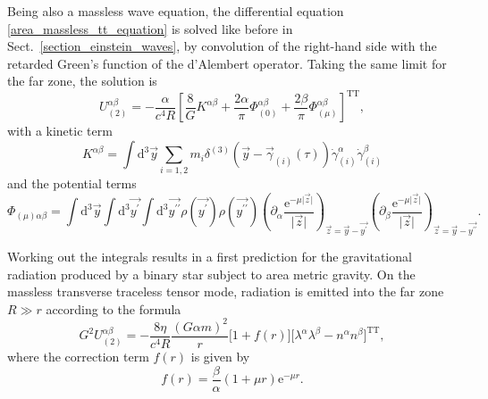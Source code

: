 Being also a massless wave equation, the differential equation \eqref{area_massless_tt_equation} is solved like before in Sect.~\ref{section_einstein_waves}, by convolution of the right-hand side with the retarded Green's function of the d'Alembert operator. Taking the same limit for the far zone, the solution is
\begin{equation}
  U^{\alpha\beta}_{(2)} = -\frac{\alpha}{c^4R}\left\lbrack \frac{8}{G} K^{\alpha\beta} + \frac{2\alpha}{\pi}\Phi^{\alpha\beta}_{(0)} + \frac{2\beta}{\pi}\Phi^{\alpha\beta}_{(\mu)} \right\rbrack^\text{TT},
\end{equation}
with a kinetic term
\begin{equation}
  K^{\alpha\beta} = \int\mathrm d^3\vec y\sum_{i=1,2}m_i\delta^{(3)}(\vec y-\vec\gamma_{(i)}(\tau))\dot\gamma^\alpha_{(i)}\dot\gamma^\beta_{(i)}
\end{equation}
and the potential terms
\begin{equation}
  \Phi_{(\mu)\alpha\beta} = \int\mathrm d^3\vec y \int\mathrm d^3\vec{y^\prime} \int\mathrm d^3\vec{y^{\prime\prime}} \rho(\vec{y^\prime}) \rho(\vec{y^{\prime\prime}}) \left(\partial_\alpha\frac{\mathrm e^{-\mu\lvert\vec z\rvert}}{\lvert\vec z\rvert}\right)_{\!\!\vec z=\vec y-\vec{y^\prime}} \left(\partial_\beta\frac{\mathrm e^{-\mu\lvert\vec z\rvert}}{\lvert\vec z\rvert}\right)_{\!\!\vec z=\vec y-\vec{y^{\prime\prime}}}.
\end{equation}

Working out the integrals results in a first prediction for the gravitational radiation produced by a binary star subject to area metric gravity. On the massless transverse traceless tensor mode, radiation is emitted into the far zone $R\gg r$ according to the formula
\begin{equation}\label{area_metric_radiation_massless}
  G^2 U^{\alpha\beta}_{(2)} = -\frac{8\eta}{c^4 R} \frac{(G\alpha m)^2}{r}\lbrack 1+f(r)\rbrack \lbrack\lambda^\alpha\lambda^\beta - n^\alpha n^\beta\rbrack^\text{TT},
\end{equation}
where the correction term $f(r)$ is given by
\begin{equation}
    f(r) = \frac{\beta}{\alpha}(1 + \mu r)\mathrm e^{-\mu r}.
\end{equation}

